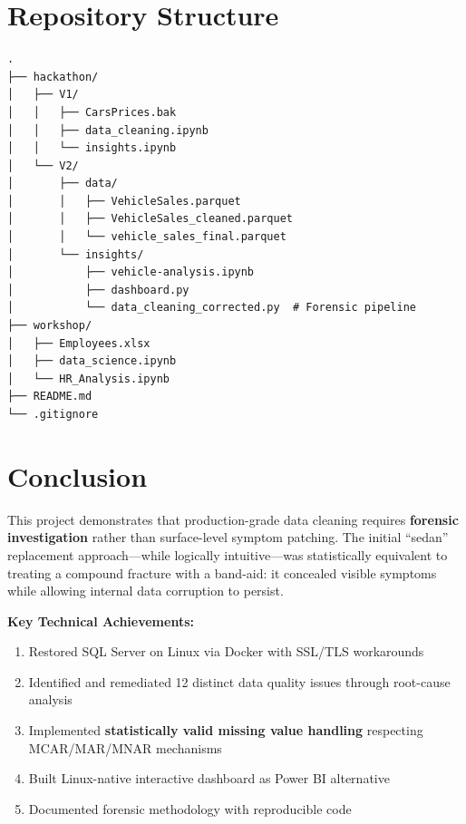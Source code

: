 \documentclass[12pt,a4paper]{article}
\begin{document}
\section{Repository Structure}

\begin{verbatim}
.
├── hackathon/
│   ├── V1/
│   │   ├── CarsPrices.bak
│   │   ├── data_cleaning.ipynb
│   │   └── insights.ipynb
│   └── V2/
│       ├── data/
│       │   ├── VehicleSales.parquet
│       │   ├── VehicleSales_cleaned.parquet
│       │   └── vehicle_sales_final.parquet
│       └── insights/
│           ├── vehicle-analysis.ipynb
│           ├── dashboard.py
│           └── data_cleaning_corrected.py  # Forensic pipeline
├── workshop/
│   ├── Employees.xlsx
│   ├── data_science.ipynb
│   └── HR_Analysis.ipynb
├── README.md
└── .gitignore
\end{verbatim}

\section{Conclusion}

This project demonstrates that production-grade data cleaning requires \textbf{forensic investigation} rather than surface-level symptom patching. The initial ``sedan'' replacement approach---while logically intuitive---was statistically equivalent to treating a compound fracture with a band-aid: it concealed visible symptoms while allowing internal data corruption to persist.

\textbf{Key Technical Achievements:}
\begin{enumerate}
    \item Restored SQL Server on Linux via Docker with SSL/TLS workarounds
    \item Identified and remediated 12 distinct data quality issues through root-cause analysis
    \item Implemented \textbf{statistically valid missing value handling} respecting MCAR/MAR/MNAR mechanisms
    \item Built Linux-native interactive dashboard as Power BI alternative
    \item Documented forensic methodology with reproducible code
\end{enumerate}
\end{document}
